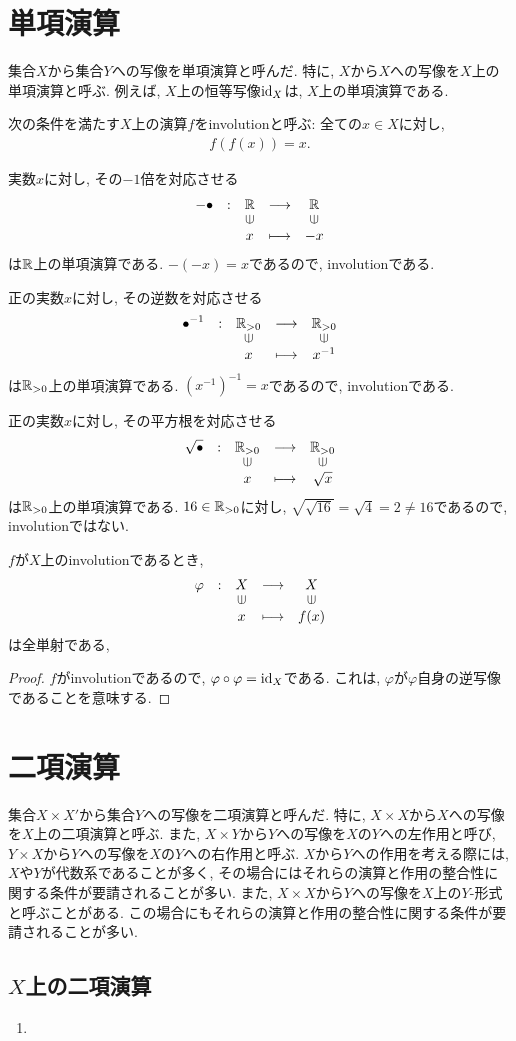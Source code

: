 \section{単項演算}
集合$X$から集合$Y$への写像を単項演算と呼んだ.
特に, $X$から$X$への写像を$X$上の単項演算と呼ぶ.
例えば, $X$上の恒等写像$\operatorname{id}_X$は, $X$上の単項演算である.
\begin{definition}
  次の条件を満たす$X$上の演算$f$をinvolutionと呼ぶ:
  全ての$x\in X$に対し,
  \begin{align*}
    f(f(x))=x.
  \end{align*}
\end{definition}
\begin{example}
  実数$x$に対し, その$-1$倍を対応させる
  \begin{align*}
    \shazo{-\bullet}
          {\RR}{\RR}
          {x}{-x}
  \end{align*}
  は$\mathbb{R}$上の単項演算である.
  $-(-x)=x$であるので,
  involutionである.
\end{example}
\begin{example}
  正の実数$x$に対し, その逆数を対応させる
  \begin{align*}
    \shazo{\bullet^{-1}}
          {\RR_{>0}}{\RR_{>0}}
          {x}{x^{-1}}
  \end{align*}
  は$\mathbb{R}_{>0}$上の単項演算である.
  $(x^{-1})^{-1}=x$であるので,
  involutionである.
\end{example}
\begin{example}
  正の実数$x$に対し, その平方根を対応させる
  \begin{align*}
    \shazo{\sqrt{\bullet}}
          {\RR_{>0}}{\RR_{>0}}
          {x}{\sqrt{x}}
  \end{align*}
  は$\mathbb{R}_{>0}$上の単項演算である.
  $16\in\mathbb{R}_{>0}$に対し,
  $\sqrt{\sqrt{16}}=\sqrt{4}=2\neq 16$であるので,
  involutionではない.
\end{example}
\begin{prop}
  $f$が$X$上のinvolutionであるとき,
  \begin{align*}
    \shazo{\varphi}
          {X}{X}
          {x}{f(x)}
  \end{align*}
  は全単射である,
\end{prop}
\begin{proof}
  $f$がinvolutionであるので, $\varphi\circ\varphi=\operatorname{id}_X$である.
  これは, $\varphi$が$\varphi$自身の逆写像であることを意味する.
\end{proof}

\section{二項演算}
集合$X\times X'$から集合$Y$への写像を二項演算と呼んだ.
特に, $X\times X$から$X$への写像を$X$上の二項演算と呼ぶ.
また, $X\times Y$から$Y$への写像を$X$の$Y$への左作用と呼び,
$Y\times X$から$Y$への写像を$X$の$Y$への右作用と呼ぶ.
$X$から$Y$への作用を考える際には,
$X$や$Y$が代数系であることが多く,
その場合にはそれらの演算と作用の整合性に関する条件が要請されることが多い.
また, $X\times X$から$Y$への写像を$X$上の$Y$-形式と呼ぶことがある.
この場合にもそれらの演算と作用の整合性に関する条件が要請されることが多い.

\subsection{$X$上の二項演算}
\begin{enumerate}
  \item
\end{enumerate}


